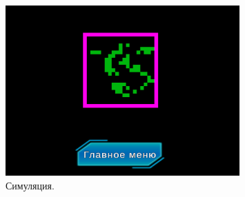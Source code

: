 \documentclass[14pt, oneside]{altsu-report}
\begin{document}
\begin{figure}[H]
	\centering
	\includegraphics[width=0.8\textwidth]{images/rand2.png}  
	\caption{Симуляция.}
	\label{uim}
\end{figure}
\end{document}
